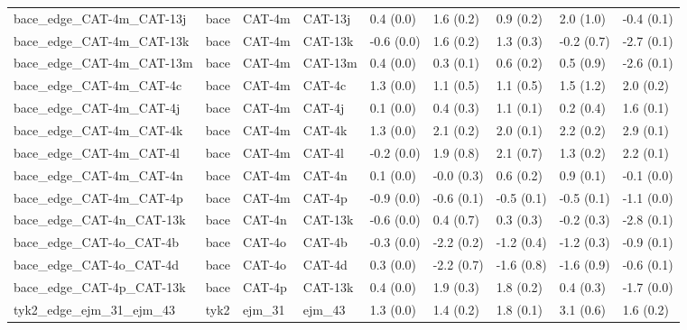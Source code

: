 \begin{tabular}{lllllllll}
bace\_edge\_CAT-4m\_CAT-13j         &      bace &      CAT-4m &     CAT-13j &   0.4 (0.0) &         1.6 (0.2) &   0.9 (0.2) &   2.0 (1.0) &  -0.4 (0.1) \\
bace\_edge\_CAT-4m\_CAT-13k         &      bace &      CAT-4m &     CAT-13k &  -0.6 (0.0) &         1.6 (0.2) &   1.3 (0.3) &  -0.2 (0.7) &  -2.7 (0.1) \\
bace\_edge\_CAT-4m\_CAT-13m         &      bace &      CAT-4m &     CAT-13m &   0.4 (0.0) &         0.3 (0.1) &   0.6 (0.2) &   0.5 (0.9) &  -2.6 (0.1) \\
bace\_edge\_CAT-4m\_CAT-4c          &      bace &      CAT-4m &      CAT-4c &   1.3 (0.0) &         1.1 (0.5) &   1.1 (0.5) &   1.5 (1.2) &   2.0 (0.2) \\
bace\_edge\_CAT-4m\_CAT-4j          &      bace &      CAT-4m &      CAT-4j &   0.1 (0.0) &         0.4 (0.3) &   1.1 (0.1) &   0.2 (0.4) &   1.6 (0.1) \\
bace\_edge\_CAT-4m\_CAT-4k          &      bace &      CAT-4m &      CAT-4k &   1.3 (0.0) &         2.1 (0.2) &   2.0 (0.1) &   2.2 (0.2) &   2.9 (0.1) \\
bace\_edge\_CAT-4m\_CAT-4l          &      bace &      CAT-4m &      CAT-4l &  -0.2 (0.0) &         1.9 (0.8) &   2.1 (0.7) &   1.3 (0.2) &   2.2 (0.1) \\
bace\_edge\_CAT-4m\_CAT-4n          &      bace &      CAT-4m &      CAT-4n &   0.1 (0.0) &        -0.0 (0.3) &   0.6 (0.2) &   0.9 (0.1) &  -0.1 (0.0) \\
bace\_edge\_CAT-4m\_CAT-4p          &      bace &      CAT-4m &      CAT-4p &  -0.9 (0.0) &        -0.6 (0.1) &  -0.5 (0.1) &  -0.5 (0.1) &  -1.1 (0.0) \\
bace\_edge\_CAT-4n\_CAT-13k         &      bace &      CAT-4n &     CAT-13k &  -0.6 (0.0) &         0.4 (0.7) &   0.3 (0.3) &  -0.2 (0.3) &  -2.8 (0.1) \\
bace\_edge\_CAT-4o\_CAT-4b          &      bace &      CAT-4o &      CAT-4b &  -0.3 (0.0) &        -2.2 (0.2) &  -1.2 (0.4) &  -1.2 (0.3) &  -0.9 (0.1) \\
bace\_edge\_CAT-4o\_CAT-4d          &      bace &      CAT-4o &      CAT-4d &   0.3 (0.0) &        -2.2 (0.7) &  -1.6 (0.8) &  -1.6 (0.9) &  -0.6 (0.1) \\
bace\_edge\_CAT-4p\_CAT-13k         &      bace &      CAT-4p &     CAT-13k &   0.4 (0.0) &         1.9 (0.3) &   1.8 (0.2) &   0.4 (0.3) &  -1.7 (0.0) \\
tyk2\_edge\_ejm\_31\_ejm\_43          &      tyk2 &      ejm\_31 &      ejm\_43 &   1.3 (0.0) &         1.4 (0.2) &   1.8 (0.1) &   3.1 (0.6) &   1.6 (0.2) \\

\end{tabular}

